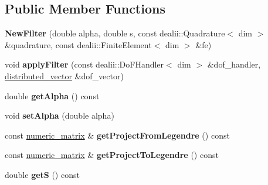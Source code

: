 \subsection*{Public Member Functions}
\begin{DoxyCompactItemize}
\item 
\hypertarget{classnatrium_1_1NewFilter_a9b4e0428b84172e6baf99f5d97570d14}{
{\bfseries NewFilter} (double alpha, double s, const dealii::Quadrature$<$ dim $>$ \&quadrature, const dealii::FiniteElement$<$ dim $>$ \&fe)}
\label{classnatrium_1_1NewFilter_a9b4e0428b84172e6baf99f5d97570d14}

\item 
\hypertarget{classnatrium_1_1NewFilter_ae5c15cce51ac8c2e5669c97c03f40a8f}{
void {\bfseries applyFilter} (const dealii::DoFHandler$<$ dim $>$ \&dof\_\-handler, \hyperlink{namespacenatrium_a903d2b92917f582f2ff05f52160ab811}{distributed\_\-vector} \&dof\_\-vector)}
\label{classnatrium_1_1NewFilter_ae5c15cce51ac8c2e5669c97c03f40a8f}

\item 
\hypertarget{classnatrium_1_1NewFilter_ad7c478d6f6eb91c68dbd65a15f75a9be}{
double {\bfseries getAlpha} () const }
\label{classnatrium_1_1NewFilter_ad7c478d6f6eb91c68dbd65a15f75a9be}

\item 
\hypertarget{classnatrium_1_1NewFilter_a99e40481e0a1846982dfbbf755855af8}{
void {\bfseries setAlpha} (double alpha)}
\label{classnatrium_1_1NewFilter_a99e40481e0a1846982dfbbf755855af8}

\item 
\hypertarget{classnatrium_1_1NewFilter_ac41f9e04b6e8510bba2a500ecb32324e}{
const \hyperlink{namespacenatrium_ad8cbec7aab93a74837b06ded39615d47}{numeric\_\-matrix} \& {\bfseries getProjectFromLegendre} () const }
\label{classnatrium_1_1NewFilter_ac41f9e04b6e8510bba2a500ecb32324e}

\item 
\hypertarget{classnatrium_1_1NewFilter_a412d1f58c4317384d847a7d2915853ab}{
const \hyperlink{namespacenatrium_ad8cbec7aab93a74837b06ded39615d47}{numeric\_\-matrix} \& {\bfseries getProjectToLegendre} () const }
\label{classnatrium_1_1NewFilter_a412d1f58c4317384d847a7d2915853ab}

\item 
\hypertarget{classnatrium_1_1NewFilter_aba20fadc302c80b8f019dc21528b9b5b}{
double {\bfseries getS} () const }
\label{classnatrium_1_1NewFilter_aba20fadc302c80b8f019dc21528b9b5b}


\end{DoxyCompactItemize}
